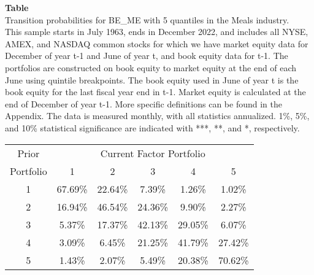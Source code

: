 \begin{table*}[ht!]
\raggedright
{}
\label{tab: transition_probs_BE_ME_Meals_with_5_quantiles}
\textbf{Table \thetable} \\
Transition probabilities for BE_ME with 5 quantiles in the Meals industry. \\
\hspace*{1em}This sample starts in July 1963, ends in December 2022, and includes all NYSE, AMEX, and NASDAQ common stocks for which we have market equity data for December of year t-1 and June of year t, and book equity data for t-1. The portfolios are constructed on book equity to market equity at the end of each June using quintile breakpoints.  The book equity used in June of year t is the book equity for the last fiscal year end in t-1.  Market equity is calculated at the end of December of year t-1.  More specific definitions can be found in the Appendix.  The data is measured monthly, with all statistics annualized.  1\%, 5\%, and 10\% statistical significance are indicated with ***, **, and *, respectively. \\
\vspace{0.5em}
\centering
\begin{adjustbox}{max width=\textwidth}
\begin{tabular}{@{}cccccc@{}}
\toprule
Prior & \multicolumn{5}{c}{Current Factor Portfolio} \\
Portfolio & 1 & 2 & 3 & 4 & 5 \\
\midrule
1 & 67.69\% & 22.64\% & 7.39\% & 1.26\% & 1.02\% \\
2 & 16.94\% & 46.54\% & 24.36\% & 9.90\% & 2.27\% \\
3 & 5.37\% & 17.37\% & 42.13\% & 29.05\% & 6.07\% \\
4 & 3.09\% & 6.45\% & 21.25\% & 41.79\% & 27.42\% \\
5 & 1.43\% & 2.07\% & 5.49\% & 20.38\% & 70.62\% \\
\bottomrule
\end{tabular}
\end{adjustbox}
\end{table*}